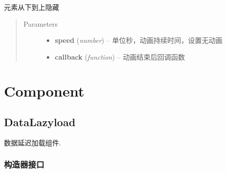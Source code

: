 \documentclass[letterpaper,10pt,english]{sphinxmanual}
\begin{document}
\begin{fulllineitems}
\label{api/core/anim/index:Anim.Node.slideUp}
元素从下到上隐藏
\begin{quote}\begin{description}
\item[{Parameters}] \leavevmode\begin{itemize}
\item {}
\textbf{speed} (\emph{number}) -- 单位秒，动画持续时间，设置无动画

\item {}
\textbf{callback} (\emph{function}) -- 动画结束后回调函数

\end{itemize}

\end{description}\end{quote}

\end{fulllineitems}



\section{Component}
\label{api/component/index:component}\label{api/component/index::doc}\label{api/component/datalazyload/index:module-DataLazyload}

\subsection{DataLazyload}
\label{api/component/datalazyload/index:datalazyload}\label{api/component/datalazyload/index::doc}
数据延迟加载组件.


\subsubsection{构造器接口}
\label{api/component/datalazyload/index:id1}
\end{document}
